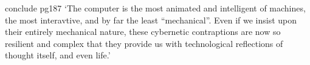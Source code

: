 conclude pg187
`The computer is the most animated and intelligent of machines, the most
interavtive, and by far the least ``mechanical''.
Even if we insist upon their entirely mechanical nature, these cybernetic
contraptions are now so resilient and complex that they provide us with
technological reflections of thought itself, and even life.'






\clearpage
\printbibliography

